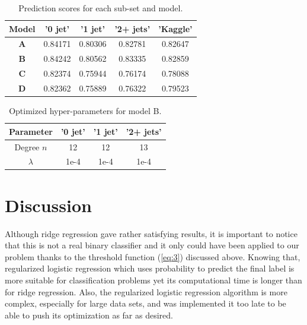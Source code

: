 \documentclass[10pt,conference,compsocconf]{IEEEtran}
\begin{document}
\begin{table}[]
    \centering
    \caption{Prediction scores for each sub-set and model.}
    \label{tab:scores}
    \begin{tabular}{|c|c|c|c|c|}
    \hline
    \textbf{Model} &  '0 jet' &  '1 jet'  & '2+ jets' & 'Kaggle'\\
    \hline
    \textbf{A} & 0.84171 & 0.80306 & 0.82781 & 0.82647\\
    \hline
    \textbf{B} & 0.84242 & 0.80562 & 0.83335 & 0.82859\\
    \hline
     \textbf{C} & 0.82374 & 0.75944 & 0.76174 & 0.78088\\
    \hline
     \textbf{D} & 0.82362 & 0.75889 & 0.76322 & 0.79523
 \\
    \hline
    \end{tabular}
    \vfill
\end{table}

\begin{table}[h!]
    \centering
    \caption{Optimized hyper-parameters for model B.}
    \label{tab:param}
    \begin{tabular}{|c|c|c|c|}
    \hline
     \textbf{Parameter} &  '0 jet' &  '1 jet' & '2+ jets'  \\
    \hline
    Degree $n$ & 12 & 12 & 13 \\
    \hline
     \textit{$\lambda$} & 1e-4 & 1e-4 & 1e-4  \\
    \hline
     \end{tabular}
     \vfill
\end{table}

\section{Discussion}
\label{sec:discussion}
Although ridge regression gave rather satisfying results, it is important to notice that this is not a real binary classifier and it only could have been applied to our problem thanks to the threshold function (\ref{eq:3}) discussed above. Knowing that, regularized logistic regression which uses probability to predict the final label is more suitable for classification problems yet its computational time is longer than for ridge regression. Also, the regularized logistic regression algorithm is more complex, especially for large data sets, and was implemented it too late to be able to push its optimization as far as desired.
\end{document}
